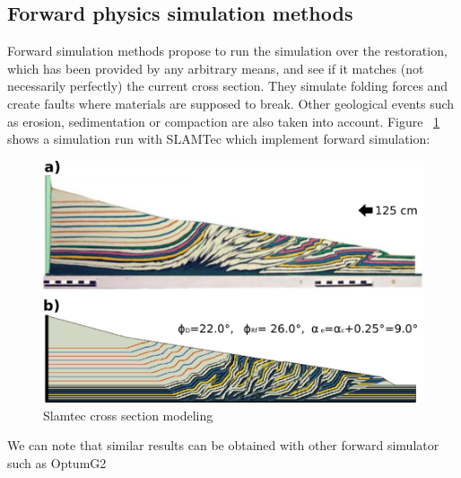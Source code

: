 \documentclass[12pt, a4paper]{report} %
\begin{document}
\subsection{Forward physics simulation methods}
Forward simulation methods propose to run the simulation over the restoration, which has been provided by any arbitrary means, and see if it matches (not necessarily perfectly) the current cross section. They simulate folding forces and create faults where materials are supposed to break. Other geological events such as erosion, sedimentation or compaction are also taken into account. Figure ~\ref{slam} shows a simulation run with SLAMTec \cite{SLAMTec} which implement forward simulation:

\begin{figure}[H]
	\centering
	\includegraphics[scale=0.5]{slamtec.png}
	\caption{Slamtec cross section modeling}
	\label{slam}
\end{figure}
We can note that similar results can be obtained with other forward simulator such as OptumG2 \cite{Optum}
\end{document}
